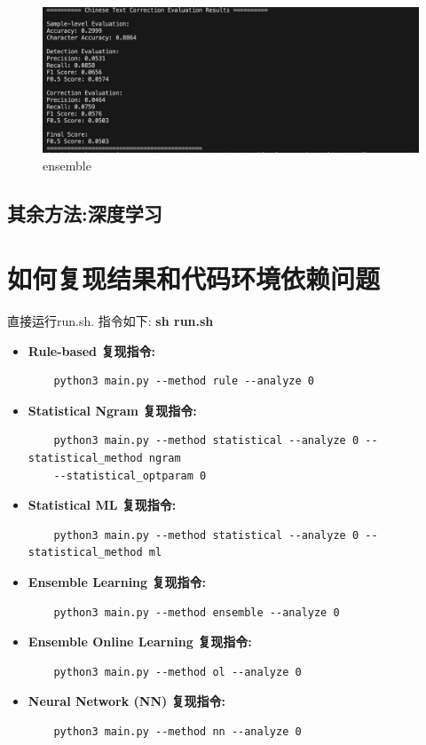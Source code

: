 \documentclass[answers]{exam}  %
\begin{document}
\begin{figure}[H]
    \centering
    \label{ensemble}
    \includegraphics[width=.6\textwidth]{../pic/ensemble.png} 
    \caption{ensemble}  
\end{figure}



\subsection{其余方法:深度学习}

\section{如何复现结果和代码环境依赖问题}

直接运行run.sh. 指令如下:
\textbf{sh run.sh}
\begin{itemize}
    \item \textbf{Rule-based 复现指令:}
    \begin{lstlisting}
    python3 main.py --method rule --analyze 0  
    \end{lstlisting}

    \item \textbf{Statistical Ngram 复现指令:}
    \begin{lstlisting}
    python3 main.py --method statistical --analyze 0 --statistical_method ngram 
    --statistical_optparam 0
    \end{lstlisting}

    \item \textbf{Statistical ML 复现指令:}
    \begin{lstlisting}
    python3 main.py --method statistical --analyze 0 --statistical_method ml 
    \end{lstlisting}

    \item \textbf{Ensemble Learning 复现指令:}
    \begin{lstlisting}
    python3 main.py --method ensemble --analyze 0
    \end{lstlisting}

    \item \textbf{Ensemble Online Learning 复现指令:}
    \begin{lstlisting}
    python3 main.py --method ol --analyze 0
    \end{lstlisting}

    \item \textbf{Neural Network (NN) 复现指令:}
    \begin{lstlisting}
    python3 main.py --method nn --analyze 0 
    \end{lstlisting}
\end{itemize}
\end{document}

